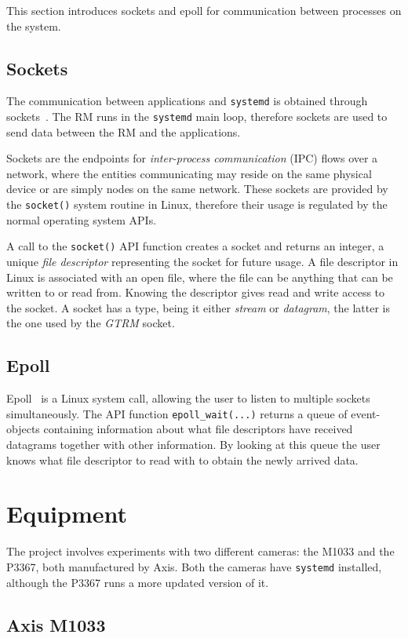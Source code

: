 \documentclass[nobiblatex]{LTHthesis}
\begin{document}
This section introduces sockets and epoll for communication between 
processes on the system.

\subsection{Sockets}
The communication between applications and \texttt{systemd} is obtained
through sockets~\cite{socket}. The RM runs in the \texttt{systemd} main 
loop, therefore sockets are used to send data between the RM and 
the applications.

Sockets are the endpoints for \emph{inter-process communication} (IPC) 
flows over a network, where the entities communicating may reside on the
same physical device or are simply nodes on the same network. These sockets
are provided by the \texttt{socket()} system routine in Linux, therefore
their usage is regulated by the normal operating system APIs.

A call to the \texttt{socket()} API function creates a socket and returns 
an integer, a unique \emph{file descriptor} representing the socket for
future usage. A file descriptor in Linux is associated with an open file,
where the file can be anything that can be written to or read from. 
Knowing the descriptor gives read and write access to the socket. 
A socket has a type, being it either \emph{stream} or \emph{datagram}, 
the latter is the one used by the \emph{GTRM} socket.


\subsection{Epoll}
Epoll~\cite{epoll} is a Linux system call, allowing the user to listen to
multiple sockets simultaneously. The API function 
\texttt{epoll\_wait(...)} returns a queue of event-objects containing 
information about what file descriptors have received datagrams together 
with other information. By looking at this queue the user knows what 
file descriptor to read with to obtain the newly arrived data.  

\section{Equipment}
The project involves experiments with two different cameras: the M1033 and 
the P3367, both manufactured by Axis. Both the cameras have \texttt{systemd}
installed, although the P3367 runs a more updated version of it. 

\subsection{Axis M1033}
\end{document}
